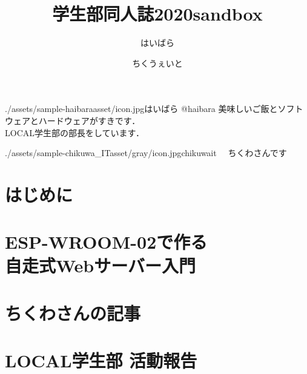 \documentclass[autodetect-engine,dvipdfmx-if-dvi,ja=standard,b5paper,10.5pt,twoside,openany,layout=v2]{bxjsbook}
\title{学生部同人誌2020sandbox}
\author{はいばら \and ちくうぇいと }
\date{}
\newcommand{\articlepath}{./articles}
\newcommand{\assetspath}{./assets}
\newcommand{\chikuwaitasset}{\assetspath/sample-chikuwa_ITasset/gray}
\newcommand{\haibaraasset}{\assetspath/sample-haibaraasset}
\begin{document}
\frontmatter
\maketitle
\begin{myintroduce}{\haibaraasset/icon.jpg}{はいばら @haibara}
  美味しいご飯とソフトウェアとハードウェアがすきです．\\
  LOCAL学生部の部長をしています．
\end{myintroduce}
\begin{myintroduce}{\chikuwaitasset/icon.jpg}{chikuwait}
　ちくわさんです
\end{myintroduce}


\chapter{はじめに}
\addtolength{\oddsidemargin}{10pt}
\addtolength{\evensidemargin}{-10pt}


\tableofcontents
\mainmatter

\chapter{ESP-WROOM-02で作る \\自走式Webサーバー入門}


\chapter{ちくわさんの記事}


\chapter{LOCAL学生部 活動報告}

  
\newpage
\myimpression[%
name=LOCAL Students\\情報ボーイズの寄稿ノート 2.0, %
author=はいばら， \and %
ちくうぇいと, %
date=2020年5月3日, %
publisher=LOCAL学生部, %
print=有限会社ねこのしっぽ %
]%
\end{document}
